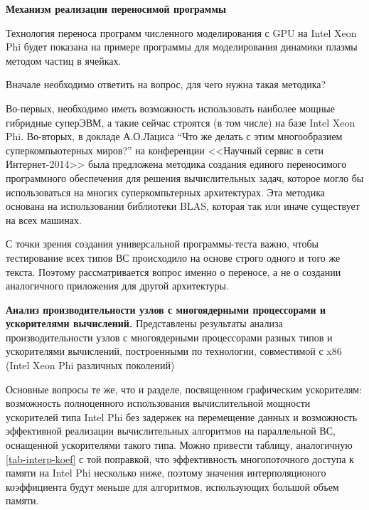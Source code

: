 \textbf{Механизм реализации переносимой программы}

Технология переноса программ численного моделирования с GPU на Intel Xeon Phi
будет показана на примере программы для моделирования динамики плазмы методом частиц в ячейках.

Вначале необходимо ответить на вопрос, для чего нужна такая методика?

Во-первых, необходимо иметь возможность использовать наиболее мощные гибридные суперЭВМ, а такие сейчас строятся (в том числе) на базе Intel Xeon Phi. Во-вторых, в
докладе А.О.Лациса “Что же делать с этим многообразием суперкомпьютерных миров?” на конференции <<Научный сервис в сети Интернет-2014>> \cite{Lacis2014} была предложена методика создания единого переносимого программного обеспечения для решения вычислительных задач, которое могло бы использоваться на многих суперкомпьтерных архитектурах. Эта методика основана на использовании библиотеки BLAS, которая так или иначе существует на всех машинах.


С точки зрения создания универсальной программы-теста важно, чтобы тестирование всех типов ВС происходило на основе строго одного и того же текста. Поэтому рассматривается вопрос именно о переносе, а не о создании аналогичного приложения для другой архитектуры. 


\textbf{Анализ производительности узлов с многоядерными процессорами и ускорителями вычислений.} 
Представлены результаты анализа производительности узлов с многоядерными процессорами разных типов и ускорителями вычислений, построенными по технологии, совместимой с x86 (Intel Xeon Phi различных поколений)

Основные вопросы те же, что и разделе, посвященном графическим ускорителям: возможность полноценного использования вычислительной мощности 
ускорителей типа Intel Phi без задержек на перемещение данных и возможность эффективной реализации вычислительных алгоритмов на параллельной ВС, оснащенной ускорителями такого типа. Можно привести таблицу, аналогичную \ref{tab-interp-koef} с той поправкой, что эффективность многопоточного доступа к памяти на Intel Phi несколько ниже, поэтому значения интерполяционого коэффициента будут меньше для алгоритмов, использующих большой объем памяти.


